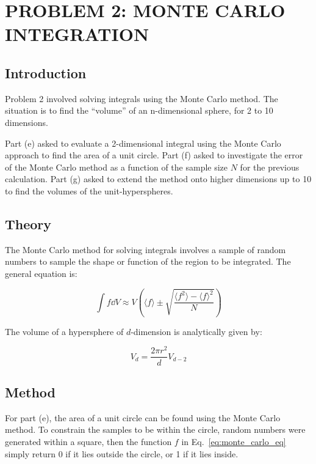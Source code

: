 \documentclass[hyphens,twocolumn,nobalancelastpage,aps,10pt,citeautoscript,longbibliography]{revtex4-2}
\begin{document}
\section{PROBLEM 2: MONTE CARLO INTEGRATION}%
\label{sec:problem_2_wave_equation}

\subsection{Introduction}%
\label{sub:introduction_2}

\noindent Problem 2 involved solving integrals using the Monte Carlo method.
The situation is to find the ``volume'' of an n-dimensional sphere, for 2 to 10
dimensions.

Part (e) asked to evaluate a 2-dimensional integral using the Monte Carlo
approach to find the area of a unit circle. Part (f) asked to investigate the
error of the Monte Carlo method as a function of the sample size $N$ for the
previous calculation. Part (g) asked to extend the method onto higher
dimensions up to 10 to find the volumes of the unit-hyperspheres.

\subsection{Theory}%
\label{sub:theory_2}

\noindent The Monte Carlo method for solving integrals involves a sample of
random numbers to sample the shape or function of the region to be integrated.
The general equation is:

\begin{equation}
	\label{eq:monte_carlo_eq}%
	\int f\dd{V}\approx V\left(\langle f \rangle \pm\sqrt{\frac{\langle f^2 \rangle - \langle f \rangle ^2}{N}}\right)
\end{equation}

The volume of a hypersphere of $d$-dimension is analytically given by:

\begin{equation}
	\label{eq:hypersphere_vol}%
	V_d = \frac{2\pi r^2}{d}V_{d-2}
\end{equation}

\subsection{Method}%
\label{sub:method_2}

\noindent For part (e), the area of a unit circle can be found using the Monte
Carlo method. To constrain the samples to be within the circle, random numbers
were generated within a square, then the function $f$ in
Eq.~\ref{eq:monte_carlo_eq} simply return 0 if it lies outside the circle, or 1
if it lies inside.
\end{document}
